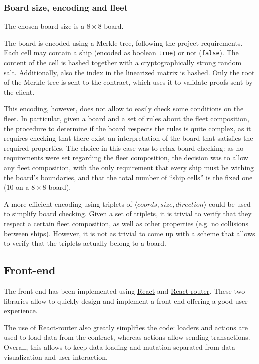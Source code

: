 \subsubsection{Board size, encoding and fleet}
The chosen board size is a $8 \times 8$ board.

The board is encoded using a Merkle tree, following the project requirements.
Each cell may contain a ship (encoded as boolean \texttt{true})
or not (\texttt{false}). The content of the cell is hashed
together with a cryptographically strong random salt. Additionally, also the
index in the linearized matrix is hashed. Only the root of the Merkle tree is
sent to the contract, which uses it to validate proofs sent by the client.

This encoding, however, does not allow to easily check some conditions on the
fleet. In particular, given a board and a set of rules about the fleet
composition, the procedure to determine if the board respects the rules is
quite complex, as it requires checking that there exist an interpretation of
the board that satisfies the required properties. The choice in this case was
to relax board checking: as no requirements were set regarding the fleet
composition, the decision was to allow any fleet composition, with the only
requirement that every ship must be withing the board's boundaries, and that
the total number of ``ship cells'' is the fixed one ($10$ on a $8\times 8$
board).

A more efficient encoding using triplets of $\langle coords, size,
	direction\rangle$ could be used to simplify board checking. Given a set of
triplets, it is trivial to verify that they respect a certain fleet
composition, as well as other properties (e.g. no collisions between ships).
However, it is not as trivial to come up with a scheme that allows to verify
that the triplets actually belong to a board.

\subsection{Front-end}
The front-end has been implemented using \href{https://react.dev/}{\color{blue}
	React} and \href{https://reactrouter.com/en/main}{\color{blue} React-router}.
These two libraries allow to quickly design and implement a front-end offering
a good user experience.

The use of React-router also greatly simplifies the code: loaders and actions
are used to load data from the contract, whereas actions allow sending
transactions. Overall, this allows to keep data loading and mutation separated
from data visualization and user interaction.


